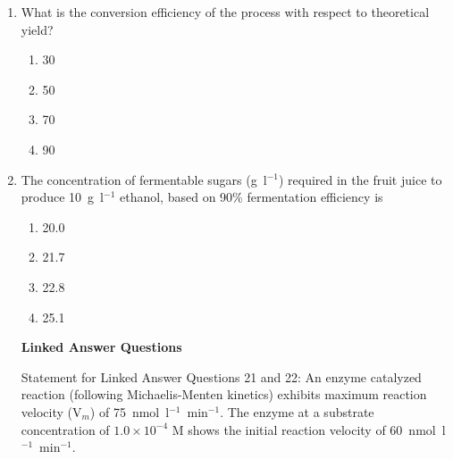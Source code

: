 \documentclass[journal,12pt,onecolumn]{IEEEtran}
\theoremstyle{remark}
\begin{document}
\begin{enumerate}
\begin{multicols}{2}
\begin{enumerate}
    \item 65
    \item 89
    \item 96
    \item 105
\end{enumerate}
\end{multicols}

\textbf{Common Data for Questions 19 and 20:} 

An actively growing culture of \textit{Acetobacter aceti} is added to the vigorously aerated fermented fruit juice medium containing 10~g~l$^{-1}$ ethanol to produce vinegar. After some time, the ethanol concentration in the medium is 0.8~g~l$^{-1}$ and acetic acid produced is 8.4~g~l$^{-1}$.


\item What is the conversion efficiency of the process with respect to theoretical yield?

\begin{multicols}{2}
\begin{enumerate}
    \item 30
    \item 50
    \item 70
    \item 90
\end{enumerate}
\end{multicols}

\item The concentration of fermentable sugars (g~l$^{-1}$) required in the fruit juice to produce 10~g~l$^{-1}$ ethanol, based on 90\% fermentation efficiency is

\begin{multicols}{2}
\begin{enumerate}
    \item 20.0
    \item 21.7
    \item 22.8
    \item 25.1
\end{enumerate}
\end{multicols}




\textbf{Linked Answer Questions}

Statement for Linked Answer Questions 21 and 22: An enzyme catalyzed reaction (following Michaelis-Menten kinetics) exhibits maximum reaction velocity (V$_m$) of 75~nmol~l$^{-1}$~min$^{-1}$. The enzyme at a substrate concentration of $1.0\times10^{-4}$ M shows the initial reaction velocity of 60~nmol~l$^{-1}$~min$^{-1}$.



\end{enumerate}
\end{document}
